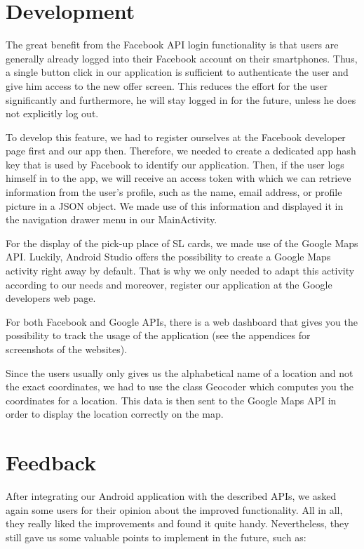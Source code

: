 \documentclass[11pt,twoside,a4paper]{report}
\begin{document}
\section{Development}

The great benefit from the Facebook API login functionality is that users are generally already logged into their Facebook account on their smartphones. Thus, a single button click in our application is sufficient to authenticate the user and give him access to the new offer screen. This reduces the effort for the user significantly and furthermore, he will stay logged in for the future, unless he does not explicitly log out.

To develop this feature, we had to register ourselves at the Facebook developer page first and our app then. Therefore, we needed to create a dedicated app hash key that is used by Facebook to identify our application. Then, if the user logs himself in to the app, we will receive an access token with which we can retrieve information from the user's profile, such as the name, email address, or profile picture in a JSON object. We made use of this information and displayed it in the navigation drawer menu in our MainActivity.

For the display of the pick-up place of SL cards, we made use of the Google Maps API. Luckily, Android Studio offers the possibility to create a Google Maps activity right away by default. That is why we only needed to adapt this activity according to our needs and moreover, register our application at the Google developers web page. 

For both Facebook and Google APIs, there is a web dashboard that gives you the possibility to track the usage of the application (see the appendices for screenshots of the websites).

Since the users usually only gives us the alphabetical name of a location and not the exact coordinates, we had to use the class Geocoder which computes you the coordinates for a location. This data is then sent to the Google Maps API in order to display the location correctly on the map.

\section{Feedback}

After integrating our Android application with the described APIs, we asked again some users for their opinion about the improved functionality. All in all, they really liked the improvements and found it quite handy. Nevertheless, they still gave us some valuable points to implement in the future, such as:
\end{document}

